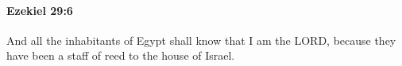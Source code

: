 
		\paragraph{Ezekiel 29:6} %
			\label{EZEKIEL-29-6}

			And all the inhabitants of Egypt shall know that I am the LORD, because they have been a staff of reed to the house of Israel.


